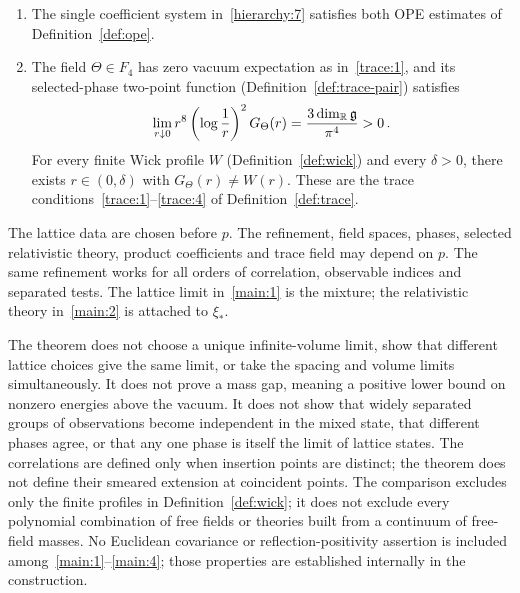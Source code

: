 \begin{theorem}
\begin{enumerate}[label=\textup{P\arabic*.},ref=P\arabic*]
\begin{equation*}
\end{equation*}
\item\label{main:3} The single coefficient system in~\ref{hierarchy:7} satisfies both OPE estimates of Definition~\ref{def:ope}.
\item\label{main:4} The field $\Theta\in F_4$ has zero vacuum expectation as in~\ref{trace:1}, and its selected-phase two-point function (Definition~\ref{def:trace-pair}) satisfies
\begin{equation*}
\lim_{r\downarrow0}r^8\left(\log\frac{1}{r}\right)^2G_\Theta(r)
=\frac{3\dim_\mathbb R\mathfrak g}{\pi^4}>0\,.
\end{equation*}
For every finite Wick profile $W$ (Definition~\ref{def:wick}) and every $\delta>0$, there exists $r\in(0,\delta)$ with $G_\Theta(r)\ne W(r)$.
These are the trace conditions~\ref{trace:1}--\ref{trace:4} of Definition~\ref{def:trace}.
\end{enumerate}
\end{theorem}

The lattice data are chosen before $p$.
The refinement, field spaces, phases, selected relativistic theory, product coefficients and trace field may depend on $p$.
The same refinement works for all orders of correlation, observable indices and separated tests.
The lattice limit in~\ref{main:1} is the mixture; the relativistic theory in~\ref{main:2} is attached to $\xi_*$.

The theorem does not choose a unique infinite-volume limit, show that different lattice choices give the same limit, or take the spacing and volume limits simultaneously.
It does not prove a mass gap, meaning a positive lower bound on nonzero energies above the vacuum.
It does not show that widely separated groups of observations become independent in the mixed state, that different phases agree, or that any one phase is itself the limit of lattice states.
The correlations are defined only when insertion points are distinct; the theorem does not define their smeared extension at coincident points.
The comparison excludes only the finite profiles in Definition~\ref{def:wick}; it does not exclude every polynomial combination of free fields or theories built from a continuum of free-field masses.
No Euclidean covariance or reflection-positivity assertion is included among~\ref{main:1}--\ref{main:4}; those properties are established internally in the construction.
